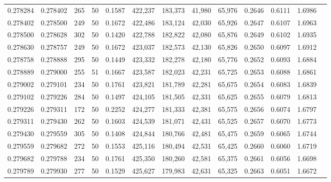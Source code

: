 \begin{tabular}{rrrrrrrrrrrrr}
0.278284 & 0.278402 &   265 &  50 &                                     0.1587 & 422,237 & 183,373 &  41,980 &  65,976 & 0.2646 & 0.6111 & 1.6986 \\
0.278402 & 0.278500 &   249 &  50 &                                     0.1672 & 422,486 & 183,124 &  42,030 &  65,926 & 0.2647 & 0.6107 & 1.6963 \\
0.278500 & 0.278628 &   302 &  50 &                                     0.1420 & 422,788 & 182,822 &  42,080 &  65,876 & 0.2649 & 0.6102 & 1.6935 \\
0.278630 & 0.278757 &   249 &  50 &                                     0.1672 & 423,037 & 182,573 &  42,130 &  65,826 & 0.2650 & 0.6097 & 1.6912 \\
0.278758 & 0.278888 &   295 &  50 &                                     0.1449 & 423,332 & 182,278 &  42,180 &  65,776 & 0.2652 & 0.6093 & 1.6884 \\
0.278889 & 0.279000 &   255 &  51 &                                     0.1667 & 423,587 & 182,023 &  42,231 &  65,725 & 0.2653 & 0.6088 & 1.6861 \\
0.279002 & 0.279101 &   234 &  50 &                                     0.1761 & 423,821 & 181,789 &  42,281 &  65,675 & 0.2654 & 0.6083 & 1.6839 \\
0.279102 & 0.279226 &   284 &  50 &                                     0.1497 & 424,105 & 181,505 &  42,331 &  65,625 & 0.2655 & 0.6079 & 1.6813 \\
0.279226 & 0.279311 &   172 &  50 &                                     0.2252 & 424,277 & 181,333 &  42,381 &  65,575 & 0.2656 & 0.6074 & 1.6797 \\
0.279311 & 0.279430 &   262 &  50 &                                     0.1603 & 424,539 & 181,071 &  42,431 &  65,525 & 0.2657 & 0.6070 & 1.6773 \\
0.279430 & 0.279559 &   305 &  50 &                                     0.1408 & 424,844 & 180,766 &  42,481 &  65,475 & 0.2659 & 0.6065 & 1.6744 \\
0.279559 & 0.279682 &   272 &  50 &                                     0.1553 & 425,116 & 180,494 &  42,531 &  65,425 & 0.2660 & 0.6060 & 1.6719 \\
0.279682 & 0.279788 &   234 &  50 &                                     0.1761 & 425,350 & 180,260 &  42,581 &  65,375 & 0.2661 & 0.6056 & 1.6698 \\
0.279789 & 0.279930 &   277 &  50 &                                     0.1529 & 425,627 & 179,983 &  42,631 &  65,325 & 0.2663 & 0.6051 & 1.6672 \\

\end{tabular}
